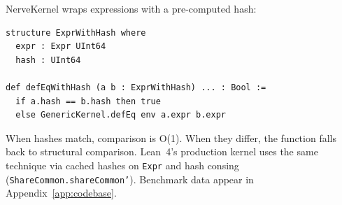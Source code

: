 NerveKernel wraps expressions with a pre-computed hash:

\begin{lstlisting}[language={},morekeywords={structure,where,def,if,then,else}]
structure ExprWithHash where
  expr : Expr UInt64
  hash : UInt64

def defEqWithHash (a b : ExprWithHash) ... : Bool :=
  if a.hash == b.hash then true
  else GenericKernel.defEq env a.expr b.expr
\end{lstlisting}

When hashes match, comparison is O(1).  When they differ, the function falls back to structural comparison.  Lean~4's production kernel uses the same technique via cached hashes on \texttt{Expr} and hash consing (\texttt{ShareCommon.shareCommon'}).  Benchmark data appear in Appendix~\ref{app:codebase}.
